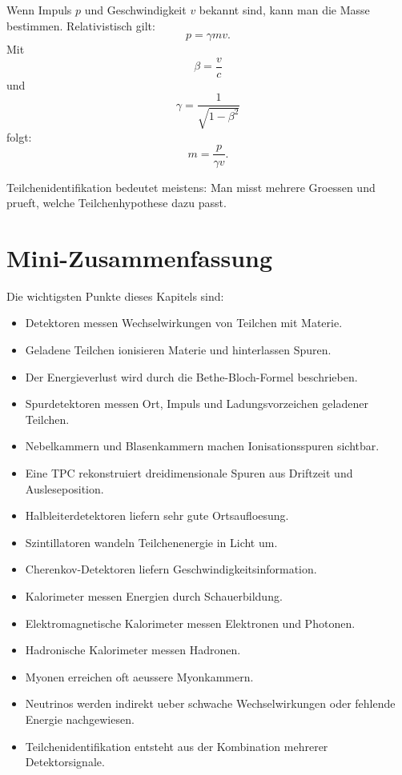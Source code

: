 \begin{formulabox}
Wenn Impuls $p$ und Geschwindigkeit $v$ bekannt sind, kann man die Masse bestimmen.
Relativistisch gilt:
\[
    p=\gamma mv.
\]
Mit
\[
    \beta=\frac{v}{c}
\]
und
\[
    \gamma=\frac{1}{\sqrt{1-\beta^2}}
\]
folgt:
\[
    m = \frac{p}{\gamma v}.
\]
\end{formulabox}

\begin{examtipbox}
Teilchenidentifikation bedeutet meistens:
Man misst mehrere Groessen und prueft, welche Teilchenhypothese dazu passt.
\end{examtipbox}

\section{Mini-Zusammenfassung}

\begin{notebox}
Die wichtigsten Punkte dieses Kapitels sind:
\begin{itemize}
    \item Detektoren messen Wechselwirkungen von Teilchen mit Materie.
    \item Geladene Teilchen ionisieren Materie und hinterlassen Spuren.
    \item Der Energieverlust wird durch die Bethe-Bloch-Formel beschrieben.
    \item Spurdetektoren messen Ort, Impuls und Ladungsvorzeichen geladener Teilchen.
    \item Nebelkammern und Blasenkammern machen Ionisationsspuren sichtbar.
    \item Eine TPC rekonstruiert dreidimensionale Spuren aus Driftzeit und Ausleseposition.
    \item Halbleiterdetektoren liefern sehr gute Ortsaufloesung.
    \item Szintillatoren wandeln Teilchenenergie in Licht um.
    \item Cherenkov-Detektoren liefern Geschwindigkeitsinformation.
    \item Kalorimeter messen Energien durch Schauerbildung.
    \item Elektromagnetische Kalorimeter messen Elektronen und Photonen.
    \item Hadronische Kalorimeter messen Hadronen.
    \item Myonen erreichen oft aeussere Myonkammern.
    \item Neutrinos werden indirekt ueber schwache Wechselwirkungen oder fehlende Energie nachgewiesen.
    \item Teilchenidentifikation entsteht aus der Kombination mehrerer Detektorsignale.
\end{itemize}
\end{notebox}

